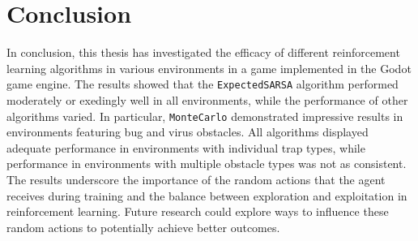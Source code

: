 \chapter*{Conclusion}

In conclusion, this thesis has investigated the efficacy of different reinforcement learning algorithms in various environments in a game implemented in the Godot game engine. The results showed that the \texttt{ExpectedSARSA} algorithm performed moderately or exedingly well in all environments, while the performance of other algorithms varied. In particular, \texttt{MonteCarlo} demonstrated impressive results in environments featuring bug and virus obstacles. All algorithms displayed adequate performance in environments with individual trap types, while performance in environments with multiple obstacle types was not as consistent. The results underscore the importance of the random actions that the agent receives during training and the balance between exploration and exploitation in reinforcement learning. Future research could explore ways to influence these random actions to potentially achieve better outcomes.